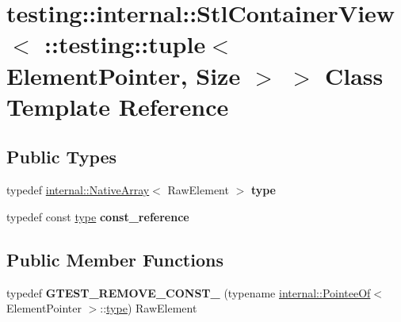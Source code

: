 \hypertarget{classtesting_1_1internal_1_1StlContainerView_3_01_1_1testing_1_1tuple_3_01ElementPointer_00_01Size_01_4_01_4}{}\section{testing\+:\+:internal\+:\+:Stl\+Container\+View$<$ \+:\+:testing\+:\+:tuple$<$ Element\+Pointer, Size $>$ $>$ Class Template Reference}
\label{classtesting_1_1internal_1_1StlContainerView_3_01_1_1testing_1_1tuple_3_01ElementPointer_00_01Size_01_4_01_4}
\subsection*{Public Types}
\begin{DoxyCompactItemize}
\item 
\mbox{\label{classtesting_1_1internal_1_1StlContainerView_3_01_1_1testing_1_1tuple_3_01ElementPointer_00_01Size_01_4_01_4_aedefb897170f76518afbca6f87b5467c}} 
typedef \hyperlink{classtesting_1_1internal_1_1NativeArray}{internal\+::\+Native\+Array}$<$ Raw\+Element $>$ {\bfseries type}
\item 
\mbox{\label{classtesting_1_1internal_1_1StlContainerView_3_01_1_1testing_1_1tuple_3_01ElementPointer_00_01Size_01_4_01_4_a4c69a4e22173b0e6f3eb55636d6a38f1}} 
typedef const \hyperlink{classtesting_1_1internal_1_1NativeArray}{type} {\bfseries const\+\_\+reference}
\end{DoxyCompactItemize}
\subsection*{Public Member Functions}
\begin{DoxyCompactItemize}
\item 
\mbox{\label{classtesting_1_1internal_1_1StlContainerView_3_01_1_1testing_1_1tuple_3_01ElementPointer_00_01Size_01_4_01_4_a2b1dd06842cb431ef647b85707ce52ff}} 
typedef {\bfseries G\+T\+E\+S\+T\+\_\+\+R\+E\+M\+O\+V\+E\+\_\+\+C\+O\+N\+S\+T\+\_\+} (typename \hyperlink{structtesting_1_1internal_1_1PointeeOf}{internal\+::\+Pointee\+Of}$<$ Element\+Pointer $>$\+::\hyperlink{classtesting_1_1internal_1_1NativeArray}{type}) Raw\+Element
\end{DoxyCompactItemize}
